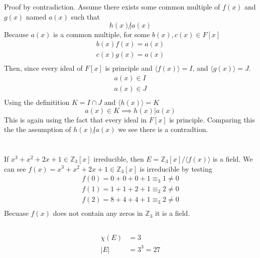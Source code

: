 \documentclass{article}
\begin{document}
\subsection{}
Proof by contradiction. Assume there exists some common multiple of $f(x)$ and $g(x)$ named $a(x)$ such that
\[
h(x) \not| a(x)
\]
Because $a(x)$ is a common multiple, for some $b(x), c(x) \in F[x]$
\[
\begin{split}
b(x)f(x) = a(x) \\
c(x)g(x) = a(x) \\
\end{split}
\]
Then, since every ideal of $F[x]$ is principle and
$\langle f(x) \rangle = I$, and $\langle g(x) \rangle = J$.
\[
\begin{split}
a(x) \in I \\
a(x) \in J \\
\end{split}
\]
Using the definitition $K = I \cap J$ and $\langle h(x) \rangle = K$
\[
a(x) \in K \implies  h(x) | a(x)
\]
This is again using the fact that every ideal in $F[x]$ is principle.
\newline
\newline
Comparing this the the assumption of $h(x) \not| a(x)$ we see there is a contradtion.

\section{}
\subsection{}
If $x^3 + x^2 + 2x + 1 \in \mathbb{Z}_3[x]$ irreducible, then $E = \mathbb{Z}_3[x]/\langle f(x) \rangle$ is a field.
\newline
\newline
We can see $f(x) = x^3 + x^2 + 2x + 1 \in \mathbb{Z}_3[x]$ is irreducible by testing
\[
\begin{split}
f(0) = 0 + 0 + 0 + 1 \equiv_{3} 1 \ne 0 \\
f(1) = 1 + 1 + 2 + 1 \equiv_{3} 2 \ne 0 \\
f(2) = 8 + 4 + 4 + 1 \equiv_{3} 2 \ne 0 \\
\end{split}
\]
Becuase $f(x)$ does not contain any zeros in $\mathbb{Z}_3$ it is a field.
\subsection{}
\[
\begin{split}
\chi(E) &= 3 \\
|E| &= 3^3 = 27 \\
\end{split}
\]
\end{document}
